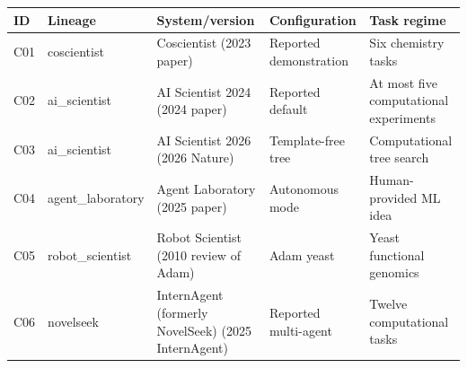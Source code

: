 \begin{tabular}{lp{.13\linewidth}p{.24\linewidth}p{.22\linewidth}p{.23\linewidth}}
\toprule
ID & Lineage & System/version & Configuration & Task regime \\
\midrule
C01 & coscientist & Coscientist (2023 paper) & Reported demonstration & Six chemistry tasks \\
C02 & ai\_scientist & AI Scientist 2024 (2024 paper) & Reported default & At most five computational experiments \\
C03 & ai\_scientist & AI Scientist 2026 (2026 Nature) & Template-free tree & Computational tree search \\
C04 & agent\_laboratory & Agent Laboratory (2025 paper) & Autonomous mode & Human-provided ML idea \\
C05 & robot\_scientist & Robot Scientist (2010 review of Adam) & Adam yeast & Yeast functional genomics \\
C06 & novelseek & InternAgent (formerly NovelSeek) (2025 InternAgent) & Reported multi-agent & Twelve computational tasks \\
\bottomrule
\end{tabular}
